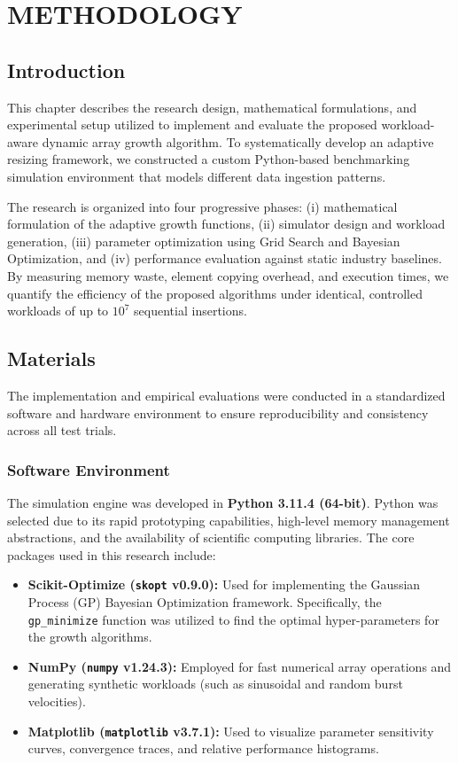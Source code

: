 \chapter{METHODOLOGY}

\section{Introduction}
This chapter describes the research design, mathematical formulations, and 
experimental setup utilized to implement and evaluate the proposed 
workload-aware dynamic array growth algorithm. To systematically develop an 
adaptive resizing framework, we constructed a custom Python-based benchmarking 
simulation environment that models different data ingestion patterns. 

The research is organized into four progressive phases: (i) mathematical 
formulation of the adaptive growth functions, (ii) simulator design and workload 
generation, (iii) parameter optimization using Grid Search and Bayesian 
Optimization, and (iv) performance evaluation against static industry baselines. 
By measuring memory waste, element copying overhead, and execution times, we 
quantify the efficiency of the proposed algorithms under identical, controlled 
workloads of up to $10^7$ sequential insertions.

\section{Materials}
The implementation and empirical evaluations were conducted in a standardized 
software and hardware environment to ensure reproducibility and consistency 
across all test trials.

\subsection{Software Environment}
The simulation engine was developed in \textbf{Python 3.11.4 (64-bit)}. Python 
was selected due to its rapid prototyping capabilities, high-level memory 
management abstractions, and the availability of scientific computing libraries. 
The core packages used in this research include:
\begin{itemize}
    \item \textbf{Scikit-Optimize (\texttt{skopt} v0.9.0):} Used for implementing 
    the Gaussian Process (GP) Bayesian Optimization framework. Specifically, the 
    \texttt{gp\_minimize} function was utilized to find the optimal hyper-parameters 
    for the growth algorithms.
    \item \textbf{NumPy (\texttt{numpy} v1.24.3):} Employed for fast numerical array 
    operations and generating synthetic workloads (such as sinusoidal and random 
    burst velocities).
    \item \textbf{Matplotlib (\texttt{matplotlib} v3.7.1):} Used to visualize 
    parameter sensitivity curves, convergence traces, and relative performance 
    histograms.
\end{itemize}

